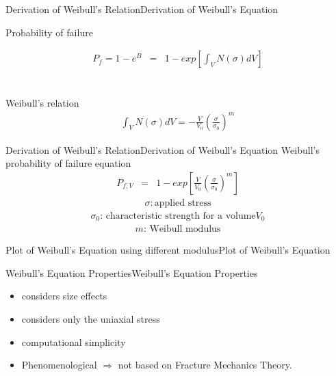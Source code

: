 \documentclass{beamer}
\begin{document}
\begin{frame}{Derivation of Weibull's Relation}{Derivation of Weibull's Equation}
\begin{centering}
Probability of failure
\end{centering} \begin{eqnarray*} P_f=1-e^B&=&1-exp\left[{\int_{V} N\left(\sigma\right)dV}\right]\end{eqnarray*}
\\~ \\Weibull's relation
\begin{eqnarray*}
\int_{V} N\left(\sigma\right)dV=-\frac{V}{V_0}\left(\frac{\sigma}{\sigma_0}\right)^m
\end{eqnarray*}
\end{frame}
\begin{frame}{Derivation of Weibull's Relation}{Derivation of Weibull's Equation}
Weibull's probability of failure equation
\begin{eqnarray*}
P_{f,V}&=& 1-exp\left[\frac{V}{V_0}\left(\frac{\sigma}{\sigma_0}\right)^m\right]
\end{eqnarray*}
\begin{eqnarray*}
\sigma : \text{applied stress}
\end{eqnarray*}
\begin{eqnarray*}
\sigma_0 \text{: characteristic strength for a volume} V_0
\end{eqnarray*}
\begin{eqnarray*}
m \text{: Weibull modulus}
\end{eqnarray*}
\end{frame}
\begin{frame}{Plot of Weibull's Equation using different modulus}{Plot of Weibull's Equation}
\begin{figure}
\centering

\label{fig:Weibull_CDF}
\end{figure}
\end{frame}

\begin{frame}{Weibull's Equation Properties}{Weibull's Equation Properties}
\begin{itemize}
\item considers size effects
\item considers only the uniaxial stress
\item computational simplicity
\item Phenomenological $\Longrightarrow$ not based on Fracture Mechanics Theory.
\end{itemize}
\end{frame}
\end{document}
